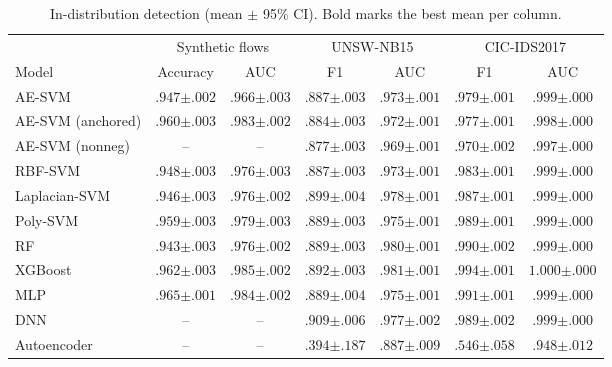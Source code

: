 \documentclass[conference,10pt]{IEEEtran}
\begin{document}
\begin{table}[t]
  \centering
  \caption{In-distribution detection (mean $\pm$ 95\% CI). Bold marks the best mean per column.}
  \label{tab:indist}
  \footnotesize
  \begin{tabular}{lcccccc}
    \toprule
    & \multicolumn{2}{c}{Synthetic flows} & \multicolumn{2}{c}{UNSW-NB15} & \multicolumn{2}{c}{CIC-IDS2017} \\
    \cmidrule(lr){2-3}\cmidrule(lr){4-5}\cmidrule(lr){6-7}
    Model & Accuracy & AUC & F1 & AUC & F1 & AUC \\
    \midrule
    AE-SVM & $.947{\scriptstyle\pm.002}$ & $.966{\scriptstyle\pm.003}$ & $.887{\scriptstyle\pm.003}$ & $.973{\scriptstyle\pm.001}$ & $.979{\scriptstyle\pm.001}$ & $.999{\scriptstyle\pm.000}$ \\
    AE-SVM (anchored) & $.960{\scriptstyle\pm.003}$ & $.983{\scriptstyle\pm.002}$ & $.884{\scriptstyle\pm.003}$ & $.972{\scriptstyle\pm.001}$ & $.977{\scriptstyle\pm.001}$ & $.998{\scriptstyle\pm.000}$ \\
    AE-SVM (nonneg) & -- & -- & $.877{\scriptstyle\pm.003}$ & $.969{\scriptstyle\pm.001}$ & $.970{\scriptstyle\pm.002}$ & $.997{\scriptstyle\pm.000}$ \\
    RBF-SVM & $.948{\scriptstyle\pm.003}$ & $.976{\scriptstyle\pm.003}$ & $.887{\scriptstyle\pm.003}$ & $.973{\scriptstyle\pm.001}$ & $.983{\scriptstyle\pm.001}$ & $.999{\scriptstyle\pm.000}$ \\
    Laplacian-SVM & $.946{\scriptstyle\pm.003}$ & $.976{\scriptstyle\pm.002}$ & $.899{\scriptstyle\pm.004}$ & $.978{\scriptstyle\pm.001}$ & $.987{\scriptstyle\pm.001}$ & $\mathbf{.999{\scriptstyle\pm.000}}$ \\
    Poly-SVM & $.959{\scriptstyle\pm.003}$ & $.979{\scriptstyle\pm.003}$ & $.889{\scriptstyle\pm.003}$ & $.975{\scriptstyle\pm.001}$ & $.989{\scriptstyle\pm.001}$ & $.999{\scriptstyle\pm.000}$ \\
    RF & $.943{\scriptstyle\pm.003}$ & $.976{\scriptstyle\pm.002}$ & $.889{\scriptstyle\pm.003}$ & $.980{\scriptstyle\pm.001}$ & $.990{\scriptstyle\pm.002}$ & $\mathbf{.999{\scriptstyle\pm.000}}$ \\
    XGBoost & $.962{\scriptstyle\pm.003}$ & $\mathbf{.985{\scriptstyle\pm.002}}$ & $.892{\scriptstyle\pm.003}$ & $\mathbf{.981{\scriptstyle\pm.001}}$ & $\mathbf{.994{\scriptstyle\pm.001}}$ & $\mathbf{1.000{\scriptstyle\pm.000}}$ \\
    MLP & $\mathbf{.965{\scriptstyle\pm.001}}$ & $.984{\scriptstyle\pm.002}$ & $.889{\scriptstyle\pm.004}$ & $.975{\scriptstyle\pm.001}$ & $.991{\scriptstyle\pm.001}$ & $\mathbf{.999{\scriptstyle\pm.000}}$ \\
    DNN & -- & -- & $\mathbf{.909{\scriptstyle\pm.006}}$ & $.977{\scriptstyle\pm.002}$ & $.989{\scriptstyle\pm.002}$ & $\mathbf{.999{\scriptstyle\pm.000}}$ \\
    Autoencoder & -- & -- & $.394{\scriptstyle\pm.187}$ & $.887{\scriptstyle\pm.009}$ & $.546{\scriptstyle\pm.058}$ & $.948{\scriptstyle\pm.012}$ \\
    \bottomrule
  \end{tabular}
\end{table}
\end{document}
